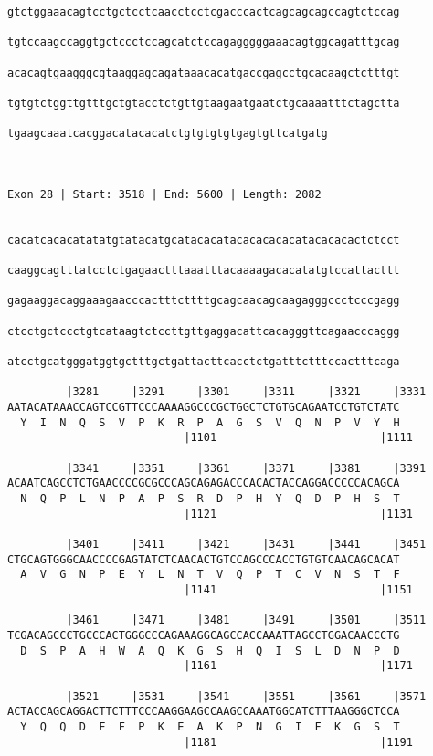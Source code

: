 \documentclass{article}
\begin{document}
\begin{Verbatim}
gtctggaaacagtcctgctcctcaacctcctcgacccactcagcagcagccagtctccag

tgtccaagccaggtgctccctccagcatctccagagggggaaacagtggcagatttgcag

acacagtgaagggcgtaaggagcagataaacacatgaccgagcctgcacaagctctttgt

tgtgtctggttgtttgctgtacctctgttgtaagaatgaatctgcaaaatttctagctta

tgaagcaaatcacggacatacacatctgtgtgtgtgagtgttcatgatg
                                                 

 
Exon 28 | Start: 3518 | End: 5600 | Length: 2082


cacatcacacatatatgtatacatgcatacacatacacacacacatacacacactctcct

caaggcagtttatcctctgagaactttaaatttacaaaagacacatatgtccattacttt

gagaaggacaggaaagaacccactttcttttgcagcaacagcaagagggccctcccgagg

ctcctgctccctgtcataagtctccttgttgaggacattcacagggttcagaacccaggg

atcctgcatgggatggtgctttgctgattacttcacctctgatttctttccactttcaga

         |3281     |3291     |3301     |3311     |3321     |3331
AATACATAAACCAGTCCGTTCCCAAAAGGCCCGCTGGCTCTGTGCAGAATCCTGTCTATC
  Y  I  N  Q  S  V  P  K  R  P  A  G  S  V  Q  N  P  V  Y  H
                           |1101                         |1111
  
         |3341     |3351     |3361     |3371     |3381     |3391
ACAATCAGCCTCTGAACCCCGCGCCCAGCAGAGACCCACACTACCAGGACCCCCACAGCA
  N  Q  P  L  N  P  A  P  S  R  D  P  H  Y  Q  D  P  H  S  T
                           |1121                         |1131
  
         |3401     |3411     |3421     |3431     |3441     |3451
CTGCAGTGGGCAACCCCGAGTATCTCAACACTGTCCAGCCCACCTGTGTCAACAGCACAT
  A  V  G  N  P  E  Y  L  N  T  V  Q  P  T  C  V  N  S  T  F
                           |1141                         |1151
  
         |3461     |3471     |3481     |3491     |3501     |3511
TCGACAGCCCTGCCCACTGGGCCCAGAAAGGCAGCCACCAAATTAGCCTGGACAACCCTG
  D  S  P  A  H  W  A  Q  K  G  S  H  Q  I  S  L  D  N  P  D
                           |1161                         |1171
  
         |3521     |3531     |3541     |3551     |3561     |3571
ACTACCAGCAGGACTTCTTTCCCAAGGAAGCCAAGCCAAATGGCATCTTTAAGGGCTCCA
  Y  Q  Q  D  F  F  P  K  E  A  K  P  N  G  I  F  K  G  S  T
                           |1181                         |1191
  

\end{Verbatim}
\end{document}
